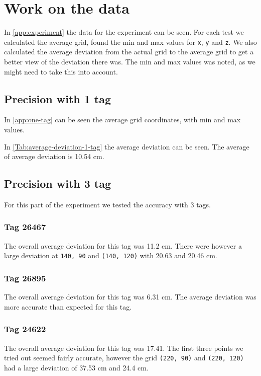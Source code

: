 \section{Work on the data}
In \autoref{app:experiment} the data for the experiment can be seen.
For each test we calculated the average grid, found the min and max values for \texttt{x}, \texttt{y} and \texttt{z}.
We also calculated the average deviation from the actual grid to the average grid to get a better view of the deviation there was.
The min and max values was noted, as we might need to take this into account. 


\subsection{Precision with 1 tag} 
In \autoref{app:one-tag} can be seen the average grid coordinates, with min and max values.

In \autoref{Tab:average-deviation-1-tag} the average deviation can be seen.
The average of average deviation is 10.54 cm.

\subsection{Precision with 3 tag}
For this part of the experiment we tested the accuracy with 3 tags. 

\subsubsection{Tag 26467}
The overall average deviation for this tag was 11.2 cm.
There were however a large deviation at \texttt{140, 90} and \texttt{(140, 120)} with 20.63 and 20.46 cm.

\subsubsection{Tag 26895}
The overall average deviation for this tag was 6.31 cm.
The average deviation was more accurate than expected for this tag.

\subsubsection{Tag 24622}
The overall average deviation for this tag was 17.41.
The first three points we tried out seemed fairly accurate, however the grid \texttt{(220, 90)} and \texttt{(220, 120)} had a large deviation of 37.53 cm and 24.4 cm.

